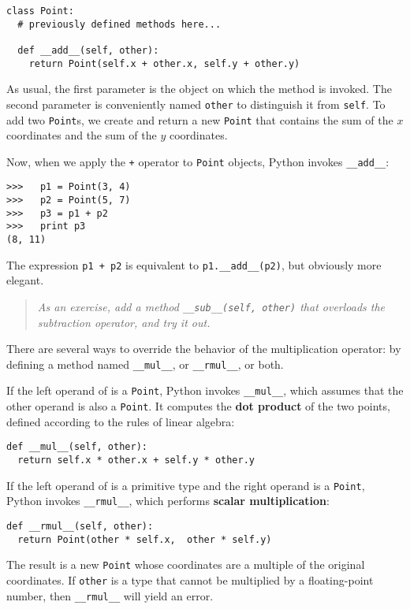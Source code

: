 \beforeverb
\begin{verbatim}
class Point:
  # previously defined methods here...

  def __add__(self, other):
    return Point(self.x + other.x, self.y + other.y)
\end{verbatim}
\afterverb
%
As usual, the first parameter is the object on which the method is
invoked.  The second parameter is conveniently named {\tt other}
to distinguish it from {\tt self}.  To add two {\tt Point}s, we create
and return a new {\tt Point} that contains  the sum of the
$x$ coordinates and the sum of the $y$ coordinates.

Now, when we apply the {\tt +} operator to {\tt Point} objects, Python
invokes {\tt \_\_add\_\_}:

\beforeverb
\begin{verbatim}
>>>   p1 = Point(3, 4)
>>>   p2 = Point(5, 7)
>>>   p3 = p1 + p2
>>>   print p3
(8, 11)
\end{verbatim}
\afterverb
%
The expression {\tt p1 + p2} is equivalent to
{\tt p1.\_\_add\_\_(p2)}, but obviously more elegant.

\begin{quote}
{\em As an exercise, add a method {\tt \_\_sub\_\_(self, other)} that
overloads the subtraction operator, and try it out.}
\end{quote}

There are several ways to override the behavior of the
multiplication operator: by defining a method named
{\tt \_\_mul\_\_}, or {\tt \_\_rmul\_\_}, or both.

If the left operand of {\tt *} is a {\tt Point}, Python invokes
{\tt \_\_mul\_\_}, which assumes that the other operand is also
a {\tt Point}.  It computes the {\bf dot product} of the two
points, defined according to the rules of linear algebra:

\beforeverb
\begin{verbatim}
def __mul__(self, other):
  return self.x * other.x + self.y * other.y
\end{verbatim}
\afterverb
%
If the left operand of {\tt *} is a primitive type and the right
operand is a {\tt Point}, Python invokes {\tt \_\_rmul\_\_}, which
performs {\bf scalar multiplication}:

\beforeverb
\begin{verbatim}
def __rmul__(self, other):
  return Point(other * self.x,  other * self.y)
\end{verbatim}
\afterverb
%
The result is a new {\tt Point} whose coordinates are a multiple
of the original coordinates.  If {\tt other} is a type that cannot
be multiplied by a floating-point number, then
{\tt \_\_rmul\_\_} will yield an error.

